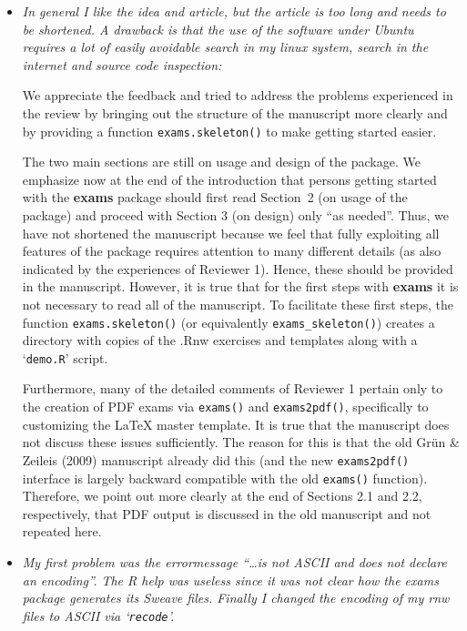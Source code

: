 \documentclass[american]{uibkletter}
\begin{document}
\begin{itemize}

\item {\it
In general I like the idea and article, but the article is too long and
needs to be shortened. A drawback is that the use of the software under
Ubuntu requires a lot of easily avoidable search in my linux system, search
in the internet and source code inspection:}

We appreciate the feedback and tried to address the problems experienced
in the review by bringing out the structure of the manuscript more clearly
and by providing a function \texttt{exams.skeleton()} to make getting started
easier.

The two main sections are still on usage and design of the package. We
emphasize now at the end of the introduction that persons getting started
with the \textbf{exams} package should first read Section~2 (on usage of the package)
and proceed with Section 3 (on design) only ``as needed''. Thus, we have not
shortened the manuscript because we feel that fully exploiting all features
of the package requires attention to many different details (as also indicated
by the experiences of Reviewer 1). Hence, these should be provided in the
manuscript. However, it is true that for the first steps with \textbf{exams} it
is not necessary to read all of the manuscript. To facilitate these first
steps, the function \texttt{exams.skeleton()} (or equivalently \verb|exams_skeleton()|)
creates a directory with copies of the .Rnw exercises and templates along
with a `\texttt{demo.R}' script.

Furthermore, many of the detailed comments of Reviewer 1 pertain only to
the creation of PDF exams via \texttt{exams()} and \texttt{exams2pdf()}, specifically to
customizing the {\LaTeX} master template. It is true that the manuscript does
not discuss these issues sufficiently. The reason for this is that the old
Gr\"un \& Zeileis (2009) manuscript already did this (and the new \texttt{exams2pdf()}
interface is largely backward compatible with the old \texttt{exams()} function).
Therefore, we point out more clearly at the end of Sections 2.1 and 2.2,
respectively, that PDF output is discussed in the old manuscript and not
repeated here.

\item {\it
My first problem was the errormessage ``\dots is not ASCII and does not
declare an encoding''.  The R help was useless since it was not clear how
the exams package generates its Sweave files.  Finally I changed the
encoding of my rnw files to ASCII via `\texttt{recode}'.}


\end{itemize}
\end{document}
